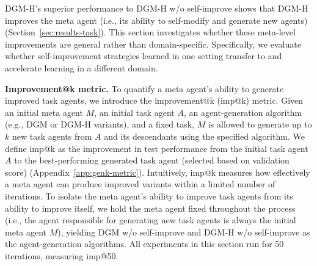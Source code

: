 DGM-H's superior performance to DGM-H w/o self-improve shows that DGM-H improves the meta agent (i.e., its ability to self-modify and generate new agents) (Section~\ref{sec:results-task}). This section investigates whether these meta-level improvements are general rather than domain-specific. Specifically, we evaluate whether self-improvement strategies learned in one setting transfer to and accelerate learning in a different domain.

\textbf{Improvement@k metric.} To quantify a meta agent's ability to generate improved task agents, we introduce the improvement@k (imp@k) metric. Given an initial meta agent $M$, an initial task agent $A$, an agent-generation algorithm (e.g., DGM or DGM-H variants), and a fixed task, $M$ is allowed to generate up to $k$ new task agents from $A$ and its descendants using the specified algorithm. We define imp@k as the improvement in test performance from the initial task agent $A$ to the best-performing generated task agent (selected based on validation score) (Appendix~\ref{app:genk-metric}). Intuitively, imp@k measures how effectively a meta agent can produce improved variants within a limited number of iterations. To isolate the meta agent's ability to improve task agents from its ability to improve itself, we hold the meta agent fixed throughout the process (i.e., the agent responsible for generating new task agents is always the initial meta agent $M$), yielding DGM w/o self-improve and DGM-H w/o self-improve as the agent-generation algorithms. All experiments in this section run for 50 iterations, measuring imp@50.

